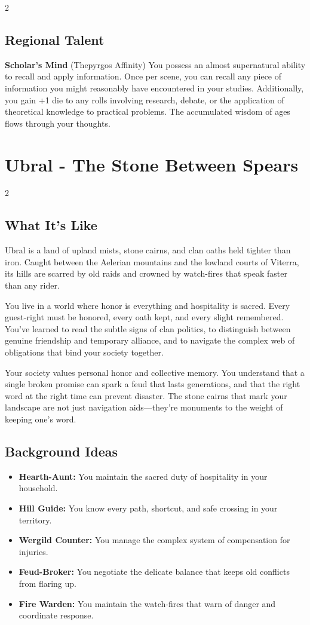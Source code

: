 \documentclass[11pt]{article}
\newcommand{\region}[1]{\section*{#1}}
\newcommand{\subregion}[1]{\subsection*{#1}}
\begin{document}
\begin{multicols}{2}
\subregion{Regional Talent}

\textbf{Scholar's Mind} (Thepyrgos Affinity)
You possess an almost supernatural ability to recall and apply information. Once per scene, you can recall any piece of information you might reasonably have encountered in your studies. Additionally, you gain +1 die to any rolls involving research, debate, or the application of theoretical knowledge to practical problems. The accumulated wisdom of ages flows through your thoughts.

\end{multicols}

\region{Ubral - The Stone Between Spears}

\begin{multicols}{2}
\subregion{What It's Like}

Ubral is a land of upland mists, stone cairns, and clan oaths held tighter than iron. Caught between the Aelerian mountains and the lowland courts of Viterra, its hills are scarred by old raids and crowned by watch-fires that speak faster than any rider.

You live in a world where honor is everything and hospitality is sacred. Every guest-right must be honored, every oath kept, and every slight remembered. You've learned to read the subtle signs of clan politics, to distinguish between genuine friendship and temporary alliance, and to navigate the complex web of obligations that bind your society together.

Your society values personal honor and collective memory. You understand that a single broken promise can spark a feud that lasts generations, and that the right word at the right time can prevent disaster. The stone cairns that mark your landscape are not just navigation aids---they're monuments to the weight of keeping one's word.

\columnbreak

\subregion{Background Ideas}

\begin{itemize}[leftmargin=*]
    \item \textbf{Hearth-Aunt:} You maintain the sacred duty of hospitality in your household.
    \item \textbf{Hill Guide:} You know every path, shortcut, and safe crossing in your territory.
    \item \textbf{Wergild Counter:} You manage the complex system of compensation for injuries.
    \item \textbf{Feud-Broker:} You negotiate the delicate balance that keeps old conflicts from flaring up.
    \item \textbf{Fire Warden:} You maintain the watch-fires that warn of danger and coordinate response.
\end{itemize}


\end{multicols}
\end{document}
